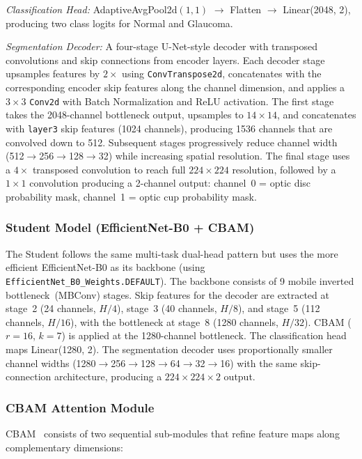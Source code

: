 \documentclass[conference]{IEEEtran}
\begin{document}
\noindent\textit{Classification Head:} AdaptiveAvgPool2d$(1,1)$ $\rightarrow$ Flatten $\rightarrow$ Linear(2048, 2), producing two class logits for Normal and Glaucoma.

\noindent\textit{Segmentation Decoder:} A four-stage U-Net-style decoder with transposed convolutions and skip connections from encoder layers. Each decoder stage upsamples features by $2{\times}$ using \texttt{ConvTranspose2d}, concatenates with the corresponding encoder skip features along the channel dimension, and applies a $3{\times}3$ \texttt{Conv2d} with Batch Normalization and ReLU activation. The first stage takes the 2048-channel bottleneck output, upsamples to $14{\times}14$, and concatenates with \texttt{layer3} skip features (1024 channels), producing 1536 channels that are convolved down to 512. Subsequent stages progressively reduce channel width (512$\rightarrow$256$\rightarrow$128$\rightarrow$32) while increasing spatial resolution. The final stage uses a $4{\times}$ transposed convolution to reach full $224{\times}224$ resolution, followed by a $1{\times}1$ convolution producing a 2-channel output: channel~0 = optic disc probability mask, channel~1 = optic cup probability mask.

\subsubsection{Student Model (EfficientNet-B0 + CBAM)}
The Student follows the same multi-task dual-head pattern but uses the more efficient EfficientNet-B0 as its backbone (using \texttt{EfficientNet\_B0\_Weights.DEFAULT}). The backbone consists of 9 mobile inverted bottleneck~(MBConv) stages. Skip features for the decoder are extracted at stage~2 (24 channels, $H/4$), stage~3 (40 channels, $H/8$), and stage~5 (112 channels, $H/16$), with the bottleneck at stage~8 (1280 channels, $H/32$). CBAM ($r{=}16$, $k{=}7$) is applied at the 1280-channel bottleneck. The classification head maps Linear(1280, 2). The segmentation decoder uses proportionally smaller channel widths (1280$\rightarrow$256$\rightarrow$128$\rightarrow$64$\rightarrow$32$\rightarrow$16) with the same skip-connection architecture, producing a $224{\times}224{\times}2$ output.

\subsubsection{CBAM Attention Module}
CBAM~\cite{woo2018} consists of two sequential sub-modules that refine feature maps along complementary dimensions:
\end{document}
